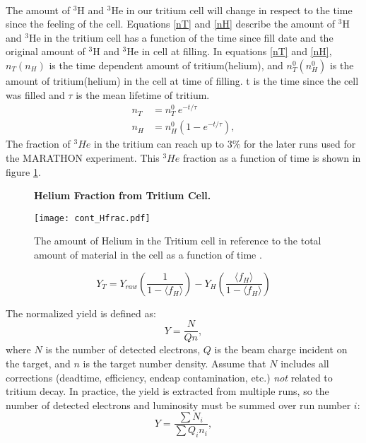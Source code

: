 \paragraph{}The amount of $^3$H and $^3$He in our tritium cell will change in respect to the time since the feeling of the cell. Equations \ref{nT} and \ref{nH} describe the amount of $^3$H and $^3$He in the tritium cell has a function of the time since fill date and the original amount of $^3$H and $^3$He in cell at filling. In equations \ref{nT} and \ref{nH}, $n_T(n_H)$ is the time dependent amount of tritium(helium), and  $n_T^0(n_H^0)$ is the amount of tritium(helium) in the cell at time of filling. t is the time since the cell was filled and $\tau$ is the mean lifetime of tritium.
\begin{align}
	n_T &= n_T^0 \: e^{-t/\tau} \label{nT}\\
	n_H &= n_H^0(1 - e^{-t/\tau}) \label{nH},
\end{align}
The fraction of $^3He$ in the tritium can reach up to 3$\%$ for the later runs used for the MARATHON experiment. This $^3He$ fraction as a function of time is shown in figure \ref{Hfract}.

\begin{figure}[]
	\centering
	\textbf{Helium Fraction from Tritium Cell. }\par\medskip
	\texttt{[image: cont\_Hfrac.pdf]}
	\caption{The amount of Helium in the Tritium cell in reference to the total amount of material in the cell as a function of time \cite{Beta}.  }
	\label{Hfract}
\end{figure}


\begin{equation}
Y_T = Y_{raw}\left(\frac{1}{1-\langle f_H \rangle}\right) - Y_H \left(\frac{\langle f_H \rangle}{1-\langle f_H \rangle}\right)
\end{equation}






The normalized yield is defined as:
\begin{equation}
Y = \frac{N}{Qn},
\end{equation}
where $N$ is the number of detected electrons, $Q$ is the beam charge incident on the target, and $n$ is the target number density.  Assume that $N$ includes all corrections (deadtime, efficiency, endcap contamination, etc.) \textit{not} related to tritium decay.  In practice, the yield is extracted from multiple runs, so the number of detected electrons and luminosity must be summed over run number $i$:
\begin{equation}
Y = \frac{\sum N_i}{\sum Q_i n_i},
\end{equation}

